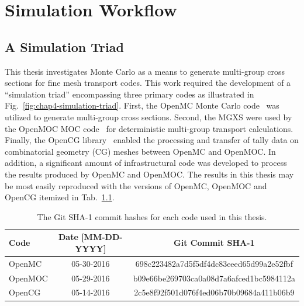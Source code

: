 \chapter{Simulation Workflow}
\label{chap:workflow}

\section{A Simulation Triad}
\label{chap4:triad}

This thesis investigates Monte Carlo as a means to generate multi-group cross sections for fine mesh transport codes. This work required the development of a ``simulation triad'' encompassing three primary codes as illustrated in Fig.~\ref{fig:chap4-simulation-triad}. First, the OpenMC Monte Carlo code~\cite{romano2013openmc} was utilized to generate multi-group cross sections. Second, the \ac{MGXS} were used by the OpenMOC \ac{MOC} code~\cite{boyd2014openmoc} for deterministic multi-group transport calculations. Finally, the OpenCG library~\cite{boyd2015opencg} enabled the processing and transfer of tally data on combinatorial geometry (CG) meshes between OpenMC and OpenMOC. In addition, a significant amount of infrastructural code was developed to process the results produced by OpenMC and OpenMOC. The results in this thesis may be most easily reproduced with the versions of OpenMC, OpenMOC and OpenCG itemized in Tab.~\ref{table:chap4-git-shas}.

\begin{table}[hb!]
  \centering
  \caption[OpenMC, OpenMOC and OpenCG Git SHA-1 hashes]{The Git SHA-1 commit hashes for each code used in this thesis.}
  \small
  \label{table:chap4-git-shas} 
  \vspace{6pt}
  \begin{tabular}{l c c}
  \toprule
  \rowcolor{lightgray}
  {\bf Code} &
  {\bf Date [MM-DD-YYYY]} &
  {\bf Git Commit SHA-1} \\
  \midrule
  OpenMC & 05-30-2016 & 698c223482a7d5f5df4dc83eeed65d99a2e52fbf \\
  OpenMOC\footnotemark & 05-29-2016 & b09e66be269703ca0a08d7a6afced1bc5984112a \\
  OpenCG & 05-14-2016 & 2c5e8f92f501d076f4ed06b70b09684a411b06b9 \\
  \bottomrule
\end{tabular}
\end{table}


